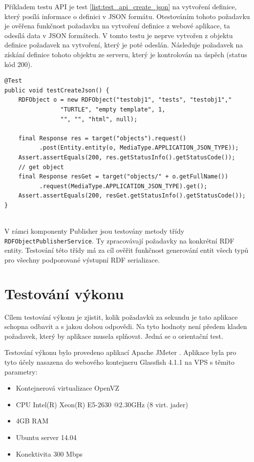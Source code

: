 \documentclass[thesis=B,czech]{FITthesis}[2012/06/26]
\begin{document}
Příkladem testu API je test \ref{list:test_api_create_json} na vytvoření definice, který posílá
informace o definici v JSON formátu. Otestováním tohoto požadavku je ověřena funkčnost požadavku na vytvoření definice z webové aplikace,
ta odesílá data v JSON formátech. V tomto testu je neprve vytvořen z objektu definice požadavek na vytvoření, který je poté odeslán. Následuje požadavek
na získání definice tohoto objektu ze serveru, který je kontrolován na úspěch (status kód 200).
  \begin{lstlisting}[float=htb,caption={Test vytvoření definice přes API v JSON formátu},label=list:test_api_create_json]
@Test
public void testCreateJson() {
    RDFObject o = new RDFObject("testobj1", "tests", "testobj1","
				"TURTLE", "empty template", 1,
				"", "", "html", null);

    final Response res = target("objects").request()
	      .post(Entity.entity(o, MediaType.APPLICATION_JSON_TYPE));
    Assert.assertEquals(200, res.getStatusInfo().getStatusCode());
    // get object
    final Response resGet = target("objects/" + o.getFullName())
	      .request(MediaType.APPLICATION_JSON_TYPE).get();
    Assert.assertEquals(200, resGet.getStatusInfo().getStatusCode());
}
    
\end{lstlisting}

V rámci komponenty Publisher jsou testovány metody třídy \\ \texttt{RDFObjectPublisherService}. Ty zpracovávají požadavky na konkrétní RDF entity.
Testování této třídy má za cíl ověřit funkčnost generování entit všech typů pro všechny podporované výstupní RDF serializace.

  
  \section{Testování výkonu}
  Cílem testování výkonu je zjistit, kolik požadavků za sekundu je tato aplikace schopna odbavit a s jakou dobou odpovědi.
  Na tyto hodnoty není předem kladen požadavek, který by aplikace
  musela splňovat. Jedná se o orientační test.
  
  Testování výkonu bylo provedeno aplikací Apache JMeter \cite{jmeter}. Aplikace byla pro tyto účely nasazena do webového kontejneru Glassfish 4.1.1 \cite{glassfish}
  na VPS s těmito parametry:
  \begin{itemize}
   \item Kontejnerová virtualizace OpenVZ
   \item CPU Intel(R) Xeon(R) E5-2630 @2.30GHz (8 virt. jader)
   \item 4GB RAM
   \item Ubuntu server 14.04
   \item Konektivita 300 Mbps
  \end{itemize}
  
\end{document}
